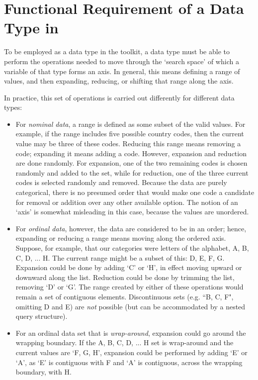 \section{Functional Requirement of a Data Type in \gdgas}
To be employed as a data type in the \gdgas toolkit, a data type must be able to perform the operations needed to move through the `search space' of which a variable of that type forms an axis. In general, this means defining a range of values, and then expanding, reducing, or shifting that range along the axis.

In practice, this set of operations is carried out differently for different data types:
\begin{itemize} 
\item For \textit{nominal data}, a range is defined as some subset of the valid values. For example, if the range includes five possible country codes, then the current value may be three of these codes. Reducing this range means removing a code; expanding it means adding a code. However, expansion and reduction are done randomly. For expansion, one of the two remaining codes is chosen randomly and added to the set, while for reduction, one of the three current codes is selected randomly and removed. Because the data are purely categorical, there is no presumed order that would make one code a candidate for removal or addition over any other available option. The notion of an `axis' is somewhat misleading in this case, because the values are unordered.
\item For \textit{ordinal data}, however, the data are considered to be in an order; hence, expanding or reducing a range means moving along the ordered axis. Suppose, for example,  that our categories were letters of the alphabet, A, B, C, D, ... H. The current range might be a subset of this: D, E, F, G. Expansion could be done by adding `C' or `H', in effect moving upward or downward along the list. Reduction could be done by trimming the list, removing `D' or `G'. The range created by either of these operations would remain a set of contiguous elements. Discontinuous sets (e.g. ``B, C, F", omitting D and E) are \textit{not} possible (but can be accommodated by a nested query structure). 
\item For an ordinal data set that is \textit{wrap-around}, expansion could go around the wrapping boundary. If the A, B, C, D, ... H set is wrap-around and the current values are `F, G, H', expansion could be performed by adding `E' or `A', as `E' is contiguous with F and `A' is contiguous, across the wrapping boundary, with H.
\end{itemize}

